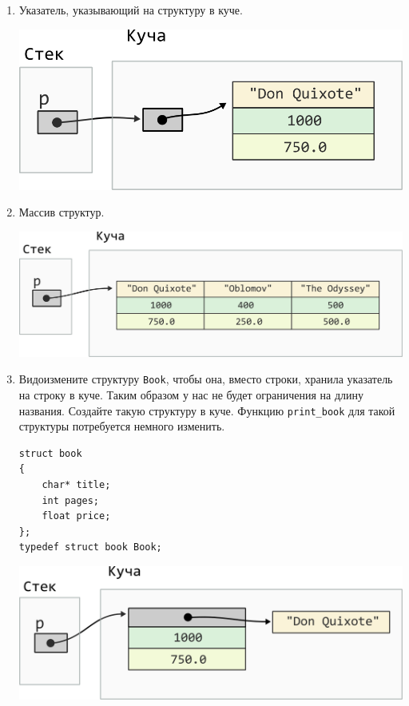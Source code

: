 \documentclass[10pt]{article}
\newcommand{\mallocImagesScale}{0.72}
\begin{document}
\begin{enumerate}
\item Указатель, указывающий на структуру в куче.
\begin{center}
\includegraphics[scale=\mallocImagesScale]{../images/malloc_homework/05heap_pointer_struct_book.png}
\end{center}


\item Массив структур.
\begin{center}
\includegraphics[scale=\mallocImagesScale]{../images/malloc_homework/06heap_struct_book_array.png}
\end{center}

\item Видоизмените структуру \texttt{Book}, чтобы она, вместо строки, хранила указатель на строку в куче. Таким образом у нас не будет ограничения на длину названия. Создайте такую структуру в куче. Функцию \texttt{print\_book} для такой структуры потребуется немного изменить.
\begin{lstlisting}
struct book 
{
    char* title;
    int pages;
    float price;
};
typedef struct book Book;
\end{lstlisting}

\begin{center}
\includegraphics[scale=\mallocImagesScale]{../images/malloc_homework/07heap_struct_book_title_heap.png}
\end{center}


\end{enumerate}
\end{document}
